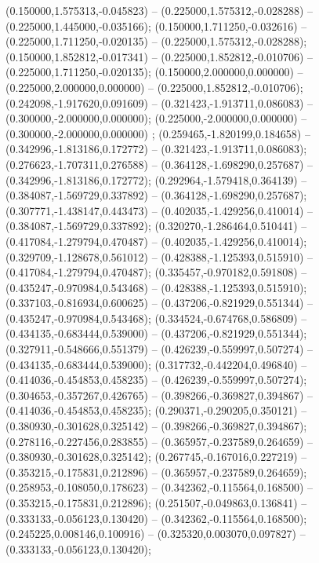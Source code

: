 (0.150000,1.575313,-0.045823) -- (0.225000,1.575312,-0.028288) -- (0.225000,1.445000,-0.035166);
 (0.150000,1.711250,-0.032616) -- (0.225000,1.711250,-0.020135) -- (0.225000,1.575312,-0.028288);
 (0.150000,1.852812,-0.017341) -- (0.225000,1.852812,-0.010706) -- (0.225000,1.711250,-0.020135);
 (0.150000,2.000000,0.000000) -- (0.225000,2.000000,0.000000) -- (0.225000,1.852812,-0.010706);
 (0.242098,-1.917620,0.091609) -- (0.321423,-1.913711,0.086083) -- (0.300000,-2.000000,0.000000);
 (0.225000,-2.000000,0.000000) -- (0.300000,-2.000000,0.000000) ;
 (0.259465,-1.820199,0.184658) -- (0.342996,-1.813186,0.172772) -- (0.321423,-1.913711,0.086083);
 (0.276623,-1.707311,0.276588) -- (0.364128,-1.698290,0.257687) -- (0.342996,-1.813186,0.172772);
 (0.292964,-1.579418,0.364139) -- (0.384087,-1.569729,0.337892) -- (0.364128,-1.698290,0.257687);
 (0.307771,-1.438147,0.443473) -- (0.402035,-1.429256,0.410014) -- (0.384087,-1.569729,0.337892);
 (0.320270,-1.286464,0.510441) -- (0.417084,-1.279794,0.470487) -- (0.402035,-1.429256,0.410014);
 (0.329709,-1.128678,0.561012) -- (0.428388,-1.125393,0.515910) -- (0.417084,-1.279794,0.470487);
 (0.335457,-0.970182,0.591808) -- (0.435247,-0.970984,0.543468) -- (0.428388,-1.125393,0.515910);
 (0.337103,-0.816934,0.600625) -- (0.437206,-0.821929,0.551344) -- (0.435247,-0.970984,0.543468);
 (0.334524,-0.674768,0.586809) -- (0.434135,-0.683444,0.539000) -- (0.437206,-0.821929,0.551344);
 (0.327911,-0.548666,0.551379) -- (0.426239,-0.559997,0.507274) -- (0.434135,-0.683444,0.539000);
 (0.317732,-0.442204,0.496840) -- (0.414036,-0.454853,0.458235) -- (0.426239,-0.559997,0.507274);
 (0.304653,-0.357267,0.426765) -- (0.398266,-0.369827,0.394867) -- (0.414036,-0.454853,0.458235);
 (0.290371,-0.290205,0.350121) -- (0.380930,-0.301628,0.325142) -- (0.398266,-0.369827,0.394867);
 (0.278116,-0.227456,0.283855) -- (0.365957,-0.237589,0.264659) -- (0.380930,-0.301628,0.325142);
 (0.267745,-0.167016,0.227219) -- (0.353215,-0.175831,0.212896) -- (0.365957,-0.237589,0.264659);
 (0.258953,-0.108050,0.178623) -- (0.342362,-0.115564,0.168500) -- (0.353215,-0.175831,0.212896);
 (0.251507,-0.049863,0.136841) -- (0.333133,-0.056123,0.130420) -- (0.342362,-0.115564,0.168500);
 (0.245225,0.008146,0.100916) -- (0.325320,0.003070,0.097827) -- (0.333133,-0.056123,0.130420);
